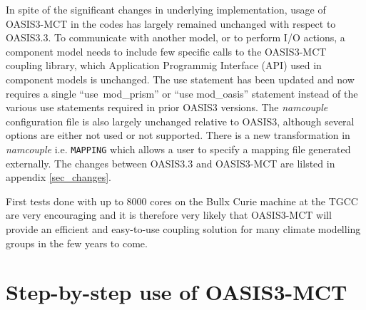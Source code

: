 In spite of the significant changes in underlying implementation, usage of OASIS3-MCT in the codes has largely remained unchanged with respect to OASIS3.3.
To communicate with another model, or to perform I/O actions, a component model needs to include few specific calls to the OASIS3-MCT coupling library, which Application Programmig Interface (API) used in component models is unchanged.  The use 
statement has been updated and now requires a single ``use\ mod\_prism'' or ``use mod\_oasis'' statement instead of the various use statements required in prior
OASIS3 versions.  The {\it namcouple} configuration file is also largely unchanged
relative to OASIS3, although several options are either not used
or not supported.  There is a new transformation in {\it namcouple}
i.e. {\tt MAPPING} which allows a user to specify a mapping
file generated externally.  The changes between OASIS3.3 and OASIS3-MCT are lilsted in appendix \ref{sec_changes}.
 
First tests done with up to
8000 cores on the Bullx Curie machine at the TGCC are very encouraging
and it is therefore very likely that OASIS3-MCT will provide an efficient and
easy-to-use coupling solution for many climate modelling groups in the few years to come. 


\section{Step-by-step use of OASIS3-MCT}

